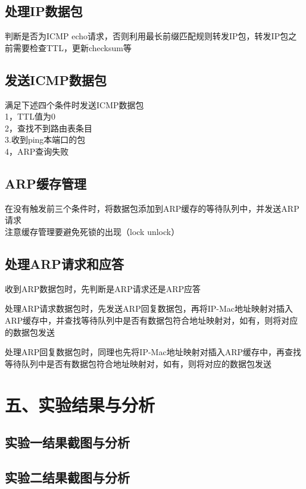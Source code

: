 \documentclass[12pt,a4paper]{ctexart}%
\begin{document}
		\subsection{处理IP数据包}
		判断是否为ICMP echo请求，否则利用最长前缀匹配规则转发IP包，转发IP包之前需要检查TTL，更新checksum等
		
		\subsection{发送ICMP数据包}
		满足下述四个条件时发送ICMP数据包\\
		1，TTL值为0\\
		2，查找不到路由表条目\\
		3.收到ping本端口的包\\
		4，ARP查询失败
		
		
		\subsection{ARP缓存管理}
		在没有触发前三个条件时，将数据包添加到ARP缓存的等待队列中，并发送ARP请求\\
		注意缓存管理要避免死锁的出现（lock unlock）
		
		\subsection{处理ARP请求和应答}
		收到ARP数据包时，先判断是ARP请求还是ARP应答
		
		处理ARP请求数据包时，先发送ARP回复数据包，再将IP-Mac地址映射对插入ARP缓存中，并查找等待队列中是否有数据包符合地址映射对，如有，则将对应的数据包发送
		
		处理ARP回复数据包时，同理也先将IP-Mac地址映射对插入ARP缓存中，再查找等待队列中是否有数据包符合地址映射对，如有，则将对应的数据包发送
		
		
			
	\section*{五、实验结果与分析}
		\setcounter{subsection}{0}
		\subsection{实验一结果截图与分析}
	
		\subsection{实验二结果截图与分析}
		
\end{document}
